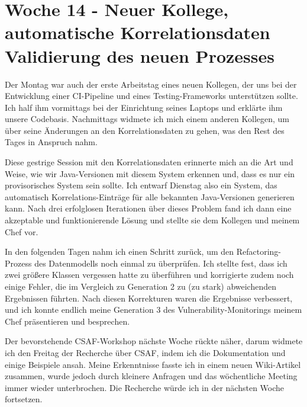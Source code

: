 \section{Woche 14 - Neuer Kollege, automatische Korrelationsdaten \headerand Validierung des neuen Prozesses} \label{sec:bericht-wo-14}


\lweekdaymarginpar{\weekdayMondayLong}

Der Montag war auch der erste Arbeitstag eines neuen Kollegen, der uns bei der Entwicklung einer CI-Pipeline und eines Testing-Frameworks unterstützen sollte.
Ich half ihm vormittags bei der Einrichtung seines Laptops und erklärte ihm unsere Codebasis.
Nachmittags widmete ich mich einem anderen Kollegen, um über seine Änderungen an den Korrelationsdaten zu gehen, was den Rest des Tages in Anspruch nahm.

\sweekdaymarginpar{\weekdayTuesdayLong}

Diese gestrige Session mit den Korrelationsdaten erinnerte mich an die Art und Weise, wie wir Java-Versionen mit diesem System erkennen und, dass es nur ein provisorisches System sein sollte.
Ich entwarf Dienstag also ein System, das automatisch Korrelations-Einträge für alle bekannten Java-Versionen generieren kann.
Nach drei erfolglosen Iterationen über dieses Problem fand ich dann eine akzeptable und funktionierende Lösung und stellte sie dem Kollegen und meinem Chef vor.


\sweekdaymarginpar{\weekdayWednesdayShort, \weekdayThursdayShort}

In den folgenden Tagen nahm ich einen Schritt zurück, um den Refactoring-Prozess des Datenmodells noch einmal zu überprüfen.
Ich stellte fest, dass ich zwei größere Klassen vergessen hatte zu überführen und korrigierte zudem noch einige Fehler, die im Vergleich zu Generation 2 zu (zu stark) abweichenden Ergebnissen führten.
Nach diesen Korrekturen waren die Ergebnisse verbessert, und ich konnte endlich meine Generation 3 des Vulnerability-Monitorings meinem Chef präsentieren und besprechen.

\sweekdaymarginpar{\weekdayFridayLong}

Der bevorstehende CSAF-Workshop nächste Woche rückte näher, darum widmete ich den Freitag der Recherche über CSAF, indem ich die Dokumentation und einige Beispiele ansah.
Meine Erkenntnisse fasste ich in einem neuen Wiki-Artikel zusammen, wurde jedoch durch kleinere Anfragen und das wöchentliche Meeting immer wieder unterbrochen.
Die Recherche würde ich in der nächsten Woche fortsetzen.
